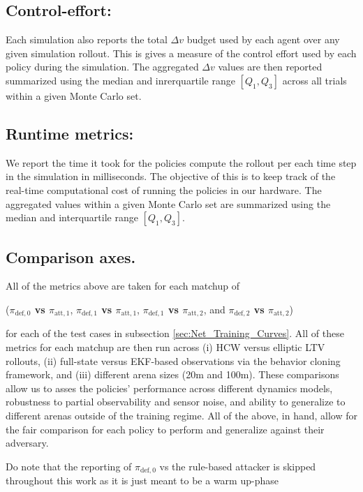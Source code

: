 \subsection*{Control-effort:}

Each simulation also reports the total \(\Delta v\) budget used by each agent over any given simulation rollout. This is gives a measure of the control effort used by each policy during the simulation. The aggregated \(\Delta v\)  values are then reported summarized using the median and inrerquartile range \([Q_1,Q_3]\)
across all trials within a given Monte Carlo set.

\subsection*{Runtime metrics:}

We report the time it took for the policies compute the rollout per each time step in the simulation in milliseconds. The objective of this is to keep track of the real-time computational cost of running the policies in our hardware. The aggregated values within a given Monte Carlo set are summarized using the median and interquartile range \([Q_1,Q_3]\). 


\subsection*{Comparison axes.}
All of the metrics above are taken for each matchup of 

({\boldmath\textbf{$\pi_{\mathrm{def},0}$ vs $\pi_{\mathrm{att},1}$}}, {\boldmath\textbf{$\pi_{\mathrm{def},1}$ vs $\pi_{\mathrm{att},1}$}}, {\boldmath\textbf{$\pi_{\mathrm{def},1}$ vs $\pi_{\mathrm{att},2}$}}, and {\boldmath\textbf{$\pi_{\mathrm{def},2}$ vs $\pi_{\mathrm{att},2}$}}) 


for each of the test cases in subsection \ref{sec:Net_Training_Curves}. All of these metrics for each matchup are then run across (i) HCW versus elliptic LTV rollouts, (ii) full-state versus EKF-based observations via the behavior cloning framework, and (iii) different arena sizes (20m and 100m). These comparisons allow us to asses the policies' performance across different dynamics models, robustness to partial observability and sensor noise, and ability to generalize to different arenas outside of the training regime.  All of the above, in hand, allow for the fair comparison for each policy to perform and generalize against their adversary.

Do note that the reporting of {\boldmath\textbf{$\pi_{\mathrm{def},0}$}} vs the rule-based attacker is skipped throughout this work as it is just meant to be a warm up-phase


